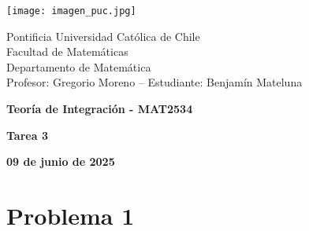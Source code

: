 \documentclass{article}
\begin{document}
\begin{minipage}{2.5cm}
    \texttt{[image: imagen\_puc.jpg]}
\end{minipage}
\begin{minipage}{14cm}
    {\sc Pontificia Universidad Católica de Chile\\
    Facultad de Matemáticas\\
    Departamento de Matemática\\
    Profesor: Gregorio Moreno -- Estudiante: Benjamín Mateluna}
\end{minipage}
\vspace{1ex}

{\centerline{\bf Teoría de Integración - MAT2534}
\centerline{\bf Tarea 3}}
\centerline{\bf 09 de junio de 2025}

\section*{Problema 1}
\end{document}
